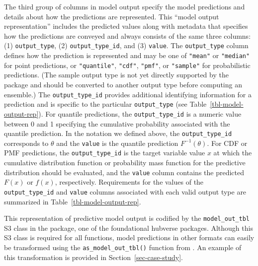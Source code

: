 \documentclass[
  article,
  shortnames,
  notitle]{jss}
\begin{document}
\begin{longtable}[]
\caption{\label{tbl-example-scenarios}Example of scenario projections
for incident COVID-19 cases, formatted according to hubverse standards.
Quantile predictions for the median and 50\% prediction intervals from a
single model are shown for four distinct scenarios. The
\texttt{location} and \texttt{origin\_date} columns have been omitted
for brevity; all forecasts in this example were made on 2021-03-07 for
the US. These predictions are a modified subset of the
\texttt{scenario\_outputs} data provided by the 
package.}

\tabularnewline
\end{longtable}

The third group of columns in model output specify the model predictions
and details about how the predictions are represented. This ``model
output representation'' includes the predicted values along with
metadata that specifies how the predictions are conveyed and always
consists of the same three columns: (1) \texttt{output\_type}, (2)
\texttt{output\_type\_id}, and (3) \texttt{value}. The
\texttt{output\_type} column defines how the prediction is represented
and may be one of \texttt{"mean"} or \texttt{"median"} for point
predictions, or \texttt{"quantile"}, \texttt{"cdf"}, \texttt{"pmf"}, or
\texttt{"sample"} for probabilistic predictions. (The sample output type
is not yet directly supported by the  package and
should be converted to another output type before computing an
ensemble.) The \texttt{output\_type\_id} provides additional identifying
information for a prediction and is specific to the particular
\texttt{output\_type} (see Table~\ref{tbl-model-output-rep}). For
quantile predictions, the \texttt{output\_type\_id} is a numeric value
between 0 and 1 specifying the cumulative probability associated with
the quantile prediction. In the notation we defined above, the
\texttt{output\_type\_id} corresponds to \(\theta\) and the
\texttt{value} is the quantile prediction \(F^{-1}(\theta)\). For CDF or
PMF predictions, the \texttt{output\_type\_id} is the target variable
value \(x\) at which the cumulative distribution function or probability
mass function for the predictive distribution should be evaluated, and
the \texttt{value} column contains the predicted \(F(x)\) or \(f(x)\),
respectively. Requirements for the values of the
\texttt{output\_type\_id} and \texttt{value} columns associated with
each valid output type are summarized in
Table~\ref{tbl-model-output-rep}.

This representation of predictive model output is codified by the
\texttt{model\_out\_tbl} S3 class in the  package, one of
the foundational hubverse packages. Although this S3 class is required
for all  functions, model predictions in other formats
can easily be transformed using the \texttt{as\_model\_out\_tbl()}
function from . An example of this transformation is
provided in Section~\ref{sec-case-study}.
\end{document}
